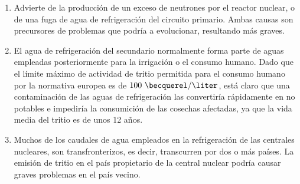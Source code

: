 \begin{enumerate}

\item  Advierte de la producción de un exceso de neutrones por el reactor nuclear, o de una fuga de agua de refrigeración del circuito primario. Ambas causas son precursores de problemas que podría a evolucionar, resultando más graves.

\item  El agua de refrigeración del secundario normalmente forma parte de aguas  empleadas posteriormente para la irrigación o el consumo humano. Dado que el límite máximo de actividad de tritio permitida para el consumo humano por la normativa europea  es de $100~\becquerel/\liter$, está claro que  una contaminación de las aguas de refrigeración las convertiría rápidamente en no potables e impediría la consumición de las cosechas afectadas, ya que la vida media del tritio es de unos 12 años.

\item  Muchos de los caudales de agua empleados en la refrigeración de las centrales nucleares, son transfronterizos, es decir, transcurren por dos o más países.  La emisión de tritio en el país propietario de la central nuclear podría causar graves problemas en el país vecino.


\end{enumerate}


